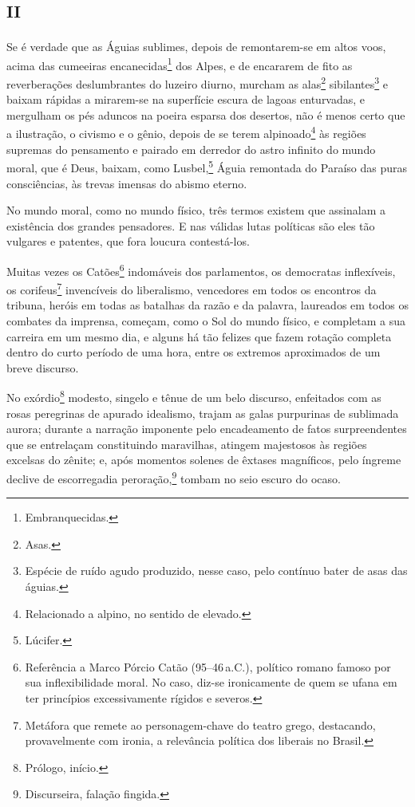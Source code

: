 \section{\textsc{ii}}

Se é verdade que as Águias sublimes, depois de remontarem-se em altos
voos, acima das cumeeiras encanecidas\footnote{Embranquecidas.} dos
Alpes, e de encararem de fito as reverberações deslumbrantes do luzeiro
diurno, murcham as alas\footnote{Asas.} sibilantes\footnote{Espécie
  de ruído agudo produzido, nesse caso, pelo contínuo bater de asas das
  águias.} e baixam rápidas a mirarem-se na superfície escura de lagoas
enturvadas, e mergulham os pés aduncos na poeira esparsa dos desertos,
não é menos certo que a ilustração, o civismo e o gênio, depois de se
terem alpinoado\footnote{Relacionado a alpino, no sentido de elevado.}
às regiões supremas do pensamento e pairado em derredor do astro
infinito do mundo moral, que é Deus, baixam, como Lusbel,\footnote{Lúcifer.}
Águia remontada do Paraíso das puras consciências, às
trevas imensas do abismo eterno.

No mundo moral, como no mundo físico, três termos existem que assinalam
a existência dos grandes pensadores. E nas válidas lutas políticas são
eles tão vulgares e patentes, que fora loucura contestá-los.

Muitas vezes os Catões\footnote{Referência a Marco Pórcio Catão (95--46\,a.C.), 
político romano famoso por sua inflexibilidade moral. No
  caso, diz-se ironicamente de quem se ufana em ter princípios
  excessivamente rígidos e severos.\label{marco}} indomáveis dos parlamentos, os
democratas inflexíveis, os corifeus\footnote{Metáfora que remete ao
  personagem-chave do teatro grego, destacando, provavelmente com
  ironia, a relevância política dos liberais no Brasil.} invencíveis do
liberalismo, vencedores em todos os encontros da tribuna, heróis em
todas as batalhas da razão e da palavra, laureados em todos os combates
da imprensa, começam, como o Sol do mundo físico, e completam a sua
carreira em um mesmo dia, e alguns há tão felizes que fazem rotação
completa dentro do curto período de uma hora, entre os extremos
aproximados de um breve discurso.

No exórdio\footnote{Prólogo, início.} modesto, singelo e tênue de um
belo discurso, enfeitados com as rosas peregrinas de apurado idealismo,
trajam as galas purpurinas de sublimada aurora; durante a narração
imponente pelo encadeamento de fatos surpreendentes que se entrelaçam
constituindo maravilhas, atingem majestosos às regiões excelsas do
zênite; e, após momentos solenes de êxtases magníficos, pelo íngreme
declive de escorregadia peroração,\footnote{Discurseira, falação
  fingida.} tombam no seio escuro do ocaso.

